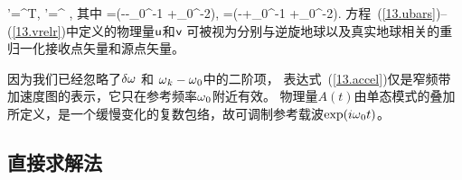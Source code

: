 {{{%
\eq \label{13.rspr2}
\ssr'=\ssZ^{\rm T}\ssu,\qquad
\sss'=\overline{\ssZ}^{\hspace{0.5 mm}
}\ssv,
\en
其中
\eq \label{13.ubars}
\ssu=(\ssI-\half\ssT-\half\om_0^{-1}\ssW
+\invtwopi\om_0^{-2}\ssA)\ssr,
\en
\eq \label{13.vrelr}
\ssv=(\ssI-\half\ssT+\half\om_0^{-1}\ssW
+\invtwopi\om_0^{-2}\ssA)\sss.
\en
方程~(\ref{13.ubars})--(\ref{13.vrelr})中定义的物理量$\mbox{${\sf u}$}$和$\mbox{${\sf v}$}$
可被视为分别与逆旋地球以及真实地球相关的重归一化接收点矢量和源点矢量。
%
%
%
%
%
%

因为我们已经忽略了$\delta\mbox{$\omega$}$ 和 $\mbox{$\omega$}_k-\mbox{$\omega$}_0$中的二阶项，
表达式~(\ref{13.accel})仅是窄频带加速度图的表示，它只在参考频率$\mbox{$\omega$}_0$附近有效。
物理量$A(t)$由单态模式的叠加所定义，是一个缓慢变化的复数包络，故可调制参考载波$\exp(i\mbox{$\omega$}_0t)$。
%
%
%
%

\subsection{直接求解法}
%
\label{13.sec.direct}

}}}
